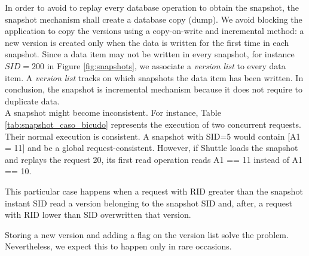 In order to avoid to replay every database operation to obtain the snapshot, the snapshot mechanism shall create a database copy (dump). We avoid blocking the application to copy the versions using a copy-on-write and incremental method: a new version is created only when the data is written for the first time in each snapshot. Since a data item may not be written in every snapshot, for instance $SID=200$ in Figure \ref{fig:snapshots}, we associate a \emph{version list} to every data item. A \emph{version list} tracks on which snapshots the data item has been written. In conclusion, the snapshot is incremental mechanism because it does not require to duplicate data.\\


A snapshot might become inconsistent. For instance, Table \ref{tab:snapshot_caso_bicudo} represents the execution of two concurrent requests. Their normal execution is consistent. A snapshot with \ac{SID}=5 would contain [A1 = 11] and be a global request-consistent. However, if Shuttle loads the snapshot and replays the request 20, its first read operation reads A1 == 11 instead of A1 == 10. 


This particular case happens when a request with \ac{RID} greater than the snapshot instant \ac{SID} read a version belonging to the snapshot \ac{SID} and, after, a request with \ac{RID} lower than \ac{SID} overwritten that version. 

Storing a new version and adding a flag on the version list solve the problem. Nevertheless, we expect this to happen only in rare occasions.



